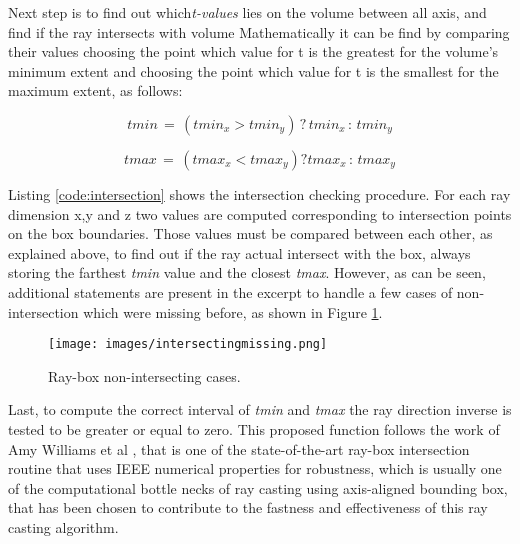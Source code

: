 \documentclass[12pt,a4paper]{extarticle}
\newcommand{\linespace}{\vspace{8pt}}
\begin{document}
Next step is to find out which\textit{t-values} lies on the volume between all axis, and find if the ray intersects with volume Mathematically it can be find by comparing their values choosing the point which value for t is the greatest for the volume's minimum extent and choosing the point which value for t is the smallest for the maximum extent, as follows:

\[
tmin\, =\, (tmin_{x} > tmin_{y})\, ?\, tmin_{x} \,:\, tmin_{y} 
\]

\[
tmax\, =\, (tmax_{x} < tmax_{y}) ? tmax_{x} \,:\, tmax_{y} 
\]


Listing \ref{code:intersection} shows the intersection checking procedure. For each ray dimension x,y and z two values are computed corresponding to intersection points on the box boundaries. Those values must be compared between each other, as explained above, to find out if the ray actual intersect with the box, always storing the farthest \textit{tmin} value and the closest \textit{tmax}.
However, as can be seen, additional statements are present in the excerpt to handle a few cases of non-intersection which were missing before, as shown in Figure \ref{fig:intersectionmissing}.
\linespace

\begin{figure}[hbtp]
\centering
\texttt{[image: images/intersectingmissing.png]}
\caption{Ray-box non-intersecting cases.}
\label{fig:intersectionmissing}
\end{figure}


Last, to compute the correct interval of \textit{tmin} and \textit{tmax} the ray direction inverse is tested to be greater or equal to zero. This proposed function follows the work of Amy Williams et al \cite{Williams:2005}, that is one of the state-of-the-art ray-box intersection routine that uses IEEE numerical properties for robustness, which is usually one of the computational bottle necks of ray casting using axis-aligned bounding box, that has been chosen to contribute to the fastness and effectiveness of this ray casting algorithm.
\end{document}
